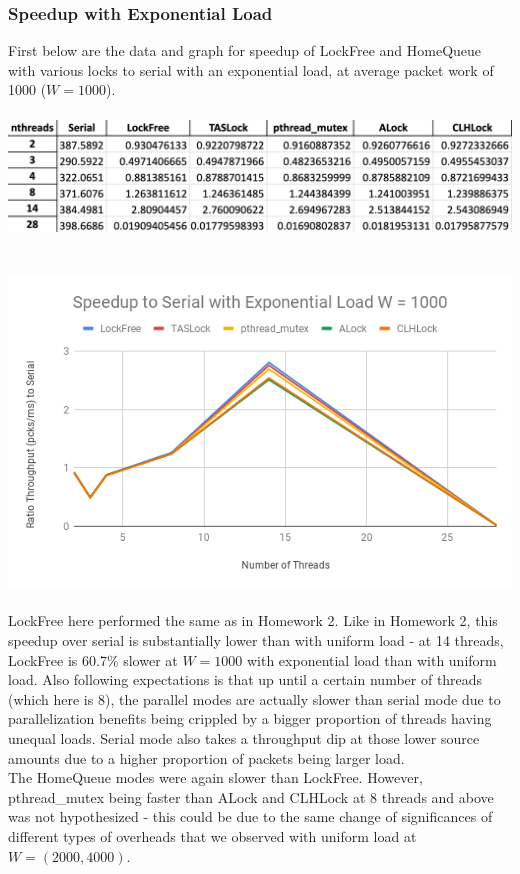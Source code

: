 \documentclass{article}
\begin{document}
\begin{adjustwidth}{-2cm}{-2cm}
\subsubsection{Speedup with Exponential Load}
First below are the data and graph for speedup of LockFree and HomeQueue with various locks to serial with an exponential load, at average packet work of 1000 ($W = 1000$).\\
\null\\
\includegraphics[width=\linewidth]{b_exp1000Data.png}\\ \null\\
\null\\
\includegraphics[width=\linewidth]{b_exp1000Graph.png}\\ \null\\
LockFree here performed the same as in Homework 2. Like in Homework 2, this speedup over serial is substantially lower than with uniform load - at 14 threads, LockFree is 60.7\% slower at $W=1000$ with exponential load than with uniform load. Also following expectations is that up until a certain number of threads (which here is 8), the parallel modes are actually slower than serial mode due to parallelization benefits being crippled by a bigger proportion of threads having unequal loads. Serial mode also takes a throughput dip at those lower source amounts due to a higher proportion of packets being larger load.\\
The HomeQueue modes were again slower than LockFree. However, pthread\_mutex being faster than ALock and CLHLock at 8 threads and above was not hypothesized - this could be due to the same change of significances of different types of overheads that we observed with uniform load at $W=(2000,4000)$.\\

\end{adjustwidth}
\end{document}
